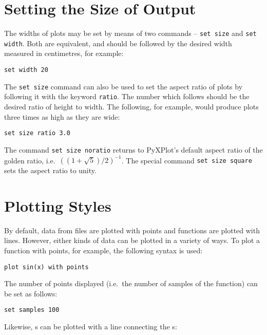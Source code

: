 \section{Setting the Size of Output}

The widths of plots may be set by means of two commands -- {\tt set
size} and {\tt set width}. Both are
equivalent, and should be followed by the desired width measured in
centimetres, for example:

\begin{verbatim}
set width 20
\end{verbatim}

The {\tt set size} command can also be used to set the aspect ratio of plots by
following it with the keyword {\tt ratio}. The number
which follows should be the desired ratio of height to width. The following,
for example, would produce plots three times as high as they are wide:

\begin{verbatim}
set size ratio 3.0
\end{verbatim}

\noindent The command {\tt set size noratio} returns to PyXPlot's default
aspect ratio of the golden ratio, i.e.\ $\left((1+\sqrt{5})/2\right)^{-1}$. The
special command {\tt set size square} sets the aspect
ratio to unity.

\section{Plotting Styles}
\label{sec:plotting_styles}

By default, data from files are plotted with points and functions are plotted
with lines. However, either kinds of data can be plotted in a variety of ways.
To plot a function with points, for example, the following syntax is used:

\begin{verbatim}
plot sin(x) with points
\end{verbatim}

\noindent The number of points displayed (i.e.\ the number of samples of the
function) can be set as follows:

\begin{verbatim}
set samples 100
\end{verbatim}

\noindent Likewise, \datafile s can be plotted with a line connecting the
\datapoint s:

